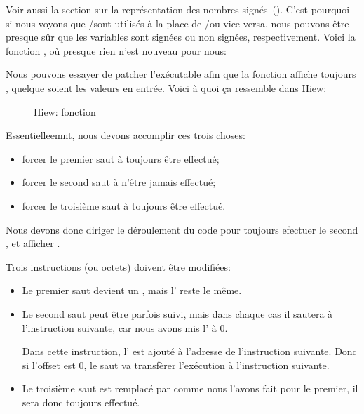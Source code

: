 Voir aussi la section sur la représentation des nombres signés~().
C'est pourquoi si nous voyons que \JG/\JL sont utilisés à la place de \JA/\JB ou
vice-versa, nous pouvons être presque sûr que les variables sont signées ou non
signées, respectivement.
Voici la fonction \main, où presque rien n'est nouveau pour nous:





\clearpage
{}

Nous pouvons essayer de patcher l'exécutable afin que la fonction 
affiche toujours , quelque soient les valeurs en entrée.
Voici à quoi ça ressemble dans Hiew:

\begin{figure}[H]
\centering
{}
\caption{Hiew: fonction }
\label{fig:jcc_hiew_1}
\end{figure}

Essentielleemnt, nous devons accomplir ces trois choses:
\begin{itemize}
\item forcer le premier saut à toujours être effectué;
\item forcer le second saut à n'être jamais effectué;
\item forcer le troisième saut à toujours être effectué.
\end{itemize}

Nous devons donc diriger le déroulement du code pour toujours efectuer le second \printf,
et afficher .

Trois instructions (ou octets) doivent être modifiées:

\begin{itemize}
\item Le premier saut devient un \JMP, mais l' reste
le même.

\item
Le second saut peut être parfois suivi, mais dans chaque cas il sautera à l'instruction
suivante, car nous avons mis l' à 0.

Dans cette instruction, l' est ajouté à l'adresse
de l'instruction suivante. Donc si l'offset est 0, le saut va transfèrer l'exécution
à l'instruction suivante.

\item
Le troisième saut est remplacé par \JMP comme nous l'avons fait pour le premier,
il sera donc toujours effectué.

\end{itemize}

